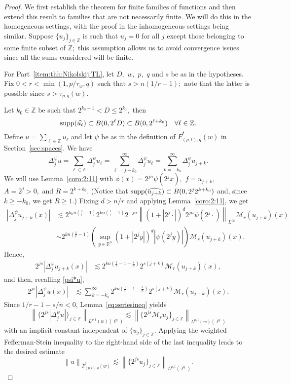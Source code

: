 \documentclass[10pt,a4paper]{article}
\theoremstyle{remark}
\newcommand{\ent}{\mathbb{Z}}
\newcommand{\rn}{{{\mathbb R}^n}}
\newcommand{\tlw}[4]{\dot F_{#1,#3}^{#2}(#4)} %
\newcommand{\M}{\mathcal{M}} %
\newcommand{\norm}[2]{\left\|#1\right\|_{#2}}
\newcommand{\supp}{{\rm{supp}}}
\newcommand{\A}{D}
\newcommand{\ex}{d}
\begin{document}
\begin{proof} We first establish the theorem for finite families of functions and then extend this result to families that are not necessarily finite.  We will do this in the homogeneous settings, with the proof in the inhomogeneous settings being similar. Suppose $\{u_j\}_{j\in\ent}$ is such that $u_j=0$ for all $j$ except those belonging to some finite subset of $\ent;$  this assumption allows us to avoid convergence issues since all the sums  considered will be finite.

For Part~\eqref{item:thh:Nikolskij:TL}, let $\A,$ $w,$ $p,$ $q$ and $s$ be as in the hypotheses. Fix $0<r<\min(1,p/\tau_w,q)$ such that  $s>n(1/r-1);$ note that the latter is possible since $s>\tau_{p,q}(w).$ 


Let $k_0 \in \ent$ be such that $2^{k_0 -1} < \A\leq 2^{k_0},$ then  
$$
\supp(\widehat{u_\ell}) \subset B(0, 2^\ell \A) \subset B(0, 2^{\ell +k_0}) \quad \forall \ell \in \ent.
$$
Define $u =\sum_{\ell \in \ent} u_\ell$ and let $\psi$ be as in the definition of $\tlw{(p,t)}{s}{q}{w}$ in Section~\ref{sec:spaces}. We have
\begin{equation}\label{psi*u}
\Delta^\psi_j u = \sum_{\ell \in \ent} \Delta^\psi_j u_\ell = \sum_{\ell = j - k_0}^\infty \Delta^\psi_j  u_\ell = \sum_{k = - k_0}^\infty \Delta^\psi_j u_{j+k}.
\end{equation}
We will use Lemma~\ref{coro:2:11} with $\phi(x) =  2^{jn} \psi(2^j x),$  $f = u_{j+k},$  $A= 2^{j  } >0,$ and $R= 2^{k + k_0}.$ (Notice that $\supp(\widehat{u_{j+k}}) \subset  B(0, 2^{j} 2^{k + k_0})$ and, since $k \geq -k_0$, we get $R \geq 1$.) Fixing  $\ex>n/r$ and applying Lemma~\ref{coro:2:11}, we get
\begin{align*}
|\Delta^\psi_j  u_{j+k}(x)| & \lesssim   2^{k_0n(\frac{1}{r} -1)} 2^{k n (\frac{1}{r} -1)}  2^{-jn} \norm{(1 + |2^j \cdot|)^\ex 2^{jn}\psi (2^j\cdot)}{L^\infty}  \M_r(u_{j+k})(x)\\
& \sim  2^{k n (\frac{1}{r} -1)} \left( \sup_{y \in \rn} (1 + |2^j y|)^\ex |\psi(2^j y)|\right) \M_r(u_{j+k})(x).
\end{align*}
 Hence,
\begin{align*}
2^{js}|\Delta^\psi_j  u_{j+k}(x)| & \lesssim 2^{k n (\frac{1}{r} -1-\frac{s}{n})} 2^{s(j+k)}\M_r(u_{j+k})(x),
\end{align*}
and then, recalling \eqref{psi*u}, 
\begin{align*}
2^{js} |\Delta^\psi_j  u(x)| & \lesssim  \sum_{k =  - k_0}^\infty 2^{k n (\frac{1}{r} -1-\frac{s}{n})} 2^{s(j+k)}\M_r(u_{j+k})(x).
\end{align*}
Since $1/r -1-s/n < 0$,   Lemma~\ref{eq:seriesineq}  yields
$$
\norm{\{ 2^{js} |\Delta^\psi_j  u|\}_{j\in\ent}}{L^{p,t}(w)(\ell^{q})} \lesssim \norm{\{2^{js} \M_ru_j\}_{j\in\ent}}{L^{p,t}(w)(\ell^{q})}
$$
with an implicit constant independent of $\{u_j\}_{j\in \ent}.$
Applying the weighted  Fefferman-Stein inequality  to the right-hand side of the last inequality leads to the desired estimate
\begin{equation*}
\norm{u}{\tlw{(p,t)}{s}{q}{w}} \lesssim \norm{\{2^{js}u_j\}_{j\in\ent}}{L^{p,t}(\ell^{q})}.
\end{equation*}



\end{proof}
\end{document}
